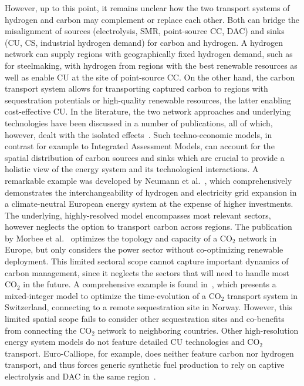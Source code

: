 \documentclass[twocolumn]{article}
\newcommand{\COtwo}{CO$_2$}
\begin{document}
However, up to this point, it remains unclear how the two transport systems of hydrogen and carbon may complement or replace each other. Both can bridge the misalignment of sources (electrolysis, SMR, point-source CC, DAC) and sinks (CU, CS, industrial hydrogen demand) for carbon and hydrogen. A hydrogen network can supply regions with geographically fixed hydrogen demand, such as for steelmaking, with hydrogen from regions with the best renewable resources as well as enable CU at the site of point-source CC. On the other hand, the carbon transport system allows for transporting captured carbon to regions with sequestration potentials or high-quality renewable resources, the latter enabling cost-effective CU.
In the literature, the two network approaches and underlying technologies have been discussed in a number of publications, all of which, however, dealt with the isolated effects~\cite{bakkenLinearModelsOptimization2008,morbeeOptimisedDeploymentEuropean2012,stewartFeasibilityEuropeanwideIntegrated2014,oeiModelingCarbonCapture2014,elahiMultiperiodLeastCost2014,burandtDecarbonizingChinaEnergy2019,middletonSimCCSOpensourceTool2020,bjerketvedtOptimalDesignCost2020,weiProposedGlobalLayout2021,damoreOptimalDesignEuropean2021,becattiniCarbonDioxideCapture2022,neumannBenefitsHydrogenNetwork2022}. Such techno-economic models, in contrast for example to Integrated Assessment Models, can account for the spatial distribution of carbon sources and sinks which are crucial to provide a holistic view of the energy system and its technological interactions. A remarkable example was developed by Neumann et al.~\cite{neumannBenefitsHydrogenNetwork2022}, which comprehensively demonstrates the interchangeability of hydrogen and electricity grid expansion in a climate-neutral European energy system at the expense of higher investments. The underlying, highly-resolved model encompasses most relevant sectors, however neglects the option to transport carbon across regions.
The publication by Morbee et al.~\cite{morbeeOptimisedDeploymentEuropean2012} optimizes the topology and capacity of a \COtwo{} network in Europe, but only considers the power sector without co-optimizing renewable deployment. This limited sectoral scope cannot capture important dynamics of carbon management, since it neglects the sectors that will need to handle most \COtwo{} in the future.
A comprehensive example is found in~\cite{becattiniCarbonDioxideCapture2022}, which presents a mixed-integer model to optimize the time-evolution of a \COtwo{} transport system in Switzerland, connecting to a remote sequestration site in Norway. However, this limited spatial scope fails to consider other sequestration sites and co-benefits from connecting the \COtwo{} network to neighboring countries.
Other high-resolution energy system models do not feature detailed CU technologies and \COtwo{} transport. Euro-Calliope, for example, does neither feature carbon nor hydrogen transport, and thus forces generic synthetic fuel production to rely on captive electrolysis and DAC in the same region~\cite{pickeringDiversityOptionsEliminate2022}.
\end{document}
